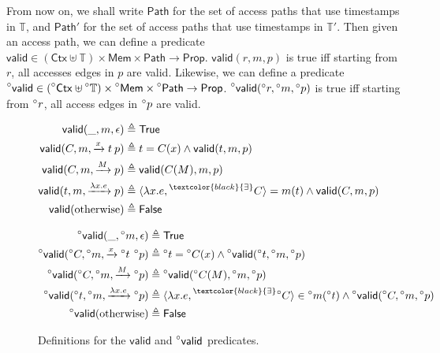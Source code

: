 \documentclass[acmsmall,review]{acmart}\settopmatter{printfolios=true,printccs=false,printacmref=false}
\theoremstyle{definition}
\theoremstyle{plain}
\newcommand*{\prexists}[2][black]{\prescript{\textcolor{#1}{\exists}}{}{#2}}
\newcommand*{\A}[1]{\prescript{\circ}{}{#1}}
\newcommand*{\Time}{\mathbb{T}}
\newcommand*{\Ctx}{\mathsf{Ctx}}
\newcommand*{\Mem}{\mathsf{Mem}}
\newcommand*{\mem}{m}
\newcommand*{\valid}{\mathsf{valid}}
\newcommand*{\Path}{\mathsf{Path}}
\begin{document}
From now on, we shall write $\Path$ for the set of access paths that use timestamps in $\Time$, and $\Path'$ for the set of access paths that use timestamps in $\Time'$.
Then given an access path, we can define a predicate $\valid\in(\Ctx\uplus\Time)\times\Mem\times\Path\rightarrow\mathsf{Prop}$.
$\valid(r,\mem,p)$ is true iff starting from $r$, all accesses edges in $p$ are valid.
Likewise, we can define a predicate $\A\valid\in(\A\Ctx\uplus\A\Time)\times\A\Mem\times\A\Path\rightarrow\mathsf{Prop}$.
$\A\valid(\A{r},\A\mem,\A{p})$ is true iff starting from $\A{r}$, all access edges in $\A{p}$ are valid.
\vspace{-1em}
\begin{figure}[h!]
  \centering
  \begin{minipage}{0.4\linewidth}
    \scriptsize
    \begin{align*}
      \valid(\_,\mem,\epsilon)                  & \triangleq\mathsf{True}                                                        \\
      \valid(C,\mem,\xrightarrow{x}t\:p)        & \triangleq t=C(x)\wedge\valid(t,\mem,p)                                        \\
      \valid(C,\mem,\xrightarrow{M}p)           & \triangleq\valid(C(M),\mem,p)                                                  \\
      \valid(t,\mem,\xrightarrow{\lambda x.e}p) & \triangleq\langle\lambda x.e,\prexists{C}\rangle=\mem(t)\wedge\valid(C,\mem,p) \\
      \valid(\text{otherwise})                  & \triangleq\mathsf{False}
    \end{align*}
  \end{minipage}
  \begin{minipage}{0.4\linewidth}
    \scriptsize
    \begin{align*}
      \A\valid(\_,\A\mem,\epsilon)                          & \triangleq\mathsf{True}                                                                                \\
      \A\valid(\A{C},\A\mem,\xrightarrow{x}\A{t}\:\A{p})    & \triangleq\A{t}=\A{C}(x)\wedge\A\valid(\A{t},\A\mem,\A{p})                                             \\
      \A\valid(\A{C},\A\mem,\xrightarrow{M}\A{p})           & \triangleq\A\valid(\A{C}(M),\A\mem,\A{p})                                                              \\
      \A\valid(\A{t},\A\mem,\xrightarrow{\lambda x.e}\A{p}) & \triangleq\langle\lambda x.e,\prexists{\A{C}}\rangle\in\A\mem(\A{t})\wedge\A\valid(\A{C},\A\mem,\A{p}) \\
      \A\valid(\text{otherwise})                            & \triangleq\mathsf{False}
    \end{align*}
  \end{minipage}
  \caption{Definitions for the $\valid$ and $\A\valid$ predicates.}
  \label{fig:valid}
  \vspace{-1em}
\end{figure}
\end{document}
